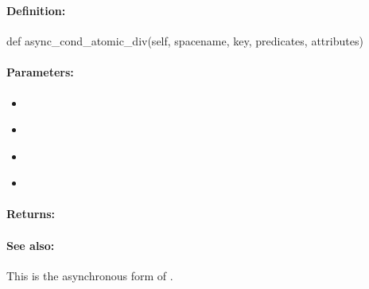 \pagebreak
\subsubsection{}
\label{api:python:async_cond_atomic_div}


\paragraph{Definition:}
\begin{pythoncode}
def async_cond_atomic_div(self, spacename, key, predicates, attributes)
\end{pythoncode}

\paragraph{Parameters:}
\begin{itemize}[noitemsep]
\item {}\\

\item {}\\

\item {}\\

\item {}\\

\end{itemize}

\paragraph{Returns:}


\paragraph{See also:}  This is the asynchronous form of .

\pagebreak
\subsubsection{}
\label{api:python:group_atomic_div}


